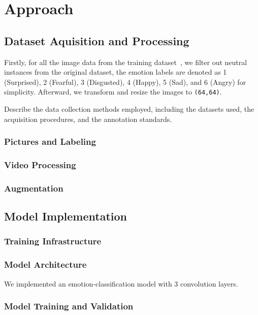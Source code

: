 \section{Approach}
\label{sec:approach}

\subsection{Dataset Aquisition and Processing}
Firstly, 
for all the image data from the training dataset~\cite{li2017reliable,li2019reliable}, 
we filter out neutral instances from the original dataset, 
the emotion labels are denoted as 1 (Surprised), 2 (Fearful), 3 (Disgusted), 4 (Happy), 5 (Sad), and 6 (Angry) for simplicity. 
Afterward, 
we transform and resize the images to \texttt{(64,64)}. 

Describe the data collection methods employed, including the datasets used, the acquisition procedures, and the annotation standards.

\subsubsection{Pictures and Labeling}
\subsubsection{Video Processing}
\subsubsection{Augmentation}

\subsection{Model Implementation}

\subsubsection{Training Infrastructure}

\subsubsection{Model Architecture}
We implemented an emotion-classification model with 3 convolution layers.


\subsubsection{Model Training and Validation}


